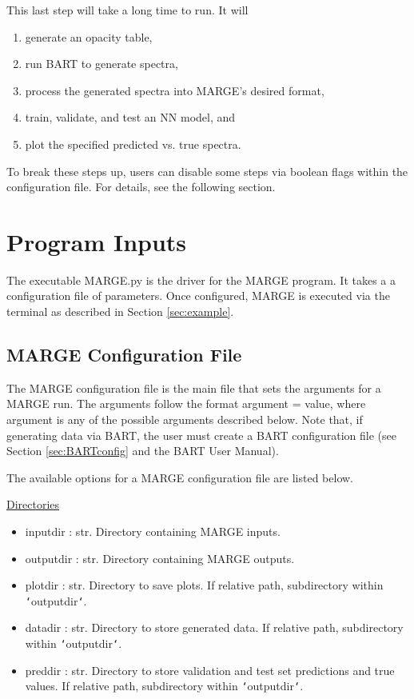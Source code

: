 \documentclass[letterpaper, 12pt]{article}
\begin{document}
\noindent This last step will take a long time to run.  It will 
\begin{enumerate}
\item generate an opacity table,
\item run BART to generate spectra,
\item process the generated spectra into MARGE's desired format,
\item train, validate, and test an NN model, and
\item plot the specified predicted vs. true spectra.
\end{enumerate}

\noindent To break these steps up, users can disable some steps via boolean 
flags within the configuration file.  For details, see the following section.


\section{Program Inputs}
\label{sec:inputs}

The executable MARGE.py is the driver for the MARGE program. It takes a 
a configuration file of parameters.  Once configured, MARGE is executed via 
the terminal as described in Section \ref{sec:example}.


\subsection{MARGE Configuration File}
\label{sec:config}
The MARGE configuration file is the main file that sets the arguments for a 
MARGE run. The arguments follow the format {\ttb argument = value}, where 
{\ttb argument} is any of the possible arguments described below. Note that, 
if generating data via BART, the user must create a BART configuration file 
(see Section \ref{sec:BARTconfig} and the BART User Manual).\newline

\noindent The available options for a MARGE configuration file are listed below.
\newline

\noindent \underline{Directories}
\begin{itemize}
\item inputdir   : str.  Directory containing MARGE inputs.
\item outputdir  : str.  Directory containing MARGE outputs.
\item plotdir    : str.  Directory to save plots. 
                         If relative path, subdirectory within 
                         \texttt{`}outputdir\texttt{`}.
\item datadir    : str.  Directory to store generated data. 
                         If relative path, subdirectory within 
                         \texttt{`}outputdir\texttt{`}.
\item preddir    : str.  Directory to store validation and test set predictions 
                         and true values. 
                         If relative path, subdirectory within 
                         \texttt{`}outputdir\texttt{`}.
\end{itemize}
\end{document}
